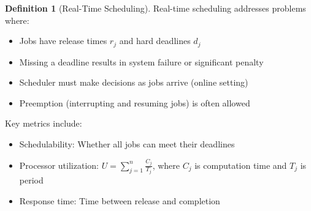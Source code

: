 \documentclass{article}
\theoremstyle{definition}
\newtheorem{definition}{Definition}
\begin{document}
\begin{definition}[Real-Time Scheduling]
Real-time scheduling addresses problems where:
\begin{itemize}
    \item Jobs have release times $r_j$ and hard deadlines $d_j$
    \item Missing a deadline results in system failure or significant penalty
    \item Scheduler must make decisions as jobs arrive (online setting)
    \item Preemption (interrupting and resuming jobs) is often allowed
\end{itemize}

Key metrics include:
\begin{itemize}
    \item Schedulability: Whether all jobs can meet their deadlines
    \item Processor utilization: $U = \sum_{j=1}^{n} \frac{C_j}{T_j}$, where $C_j$ is computation time and $T_j$ is period
    \item Response time: Time between release and completion
\end{itemize}
\end{definition}
\end{document}
